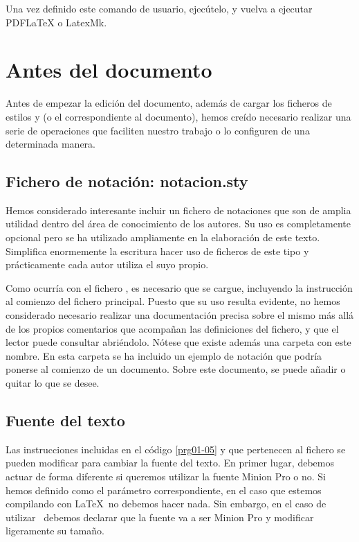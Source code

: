 Una vez definido este comando de usuario, ejecútelo, y vuelva a ejecutar PDFLaTeX o LatexMk.

\section{Antes del documento}
Antes de empezar la edición del documento, además de cargar los ficheros de estilos  y  (o el correspondiente al documento),  hemos creído necesario realizar una serie de operaciones que faciliten nuestro trabajo o lo configuren de una determinada manera. %

\subsection{Fichero de notación: notacion.sty}
Hemos considerado interesante incluir un fichero de notaciones que son de amplia utilidad dentro del área de conocimiento de los autores. Su uso es completamente opcional pero se ha utilizado ampliamente en la elaboración de este texto. Simplifica enormemente la escritura hacer uso de ficheros de este tipo y prácticamente cada autor utiliza el suyo propio.

Como ocurría con el fichero , es necesario que se cargue, incluyendo la instrucción  al comienzo del fichero principal. Puesto que su uso resulta evidente, no hemos considerado necesario realizar una documentación precisa sobre el mismo más allá de los propios comentarios que acompañan las definiciones del fichero, y que el lector puede consultar abriéndolo. Nótese que existe además una carpeta con este nombre. En esta carpeta se ha incluido un ejemplo de notación que podría ponerse al comienzo de un documento. Sobre este documento, se puede añadir o quitar lo que se desee.

\subsection{Fuente del texto}
Las instrucciones incluidas en el código \ref{prg01-05} y que pertenecen al fichero  
 se pueden modificar para cambiar la fuente del texto.  En primer lugar, debemos actuar de forma diferente si queremos utilizar la fuente Minion Pro o no.  Si hemos definido como  el parámetro correspondiente, en el caso que estemos compilando con \LaTeX\ no debemos hacer nada. Sin embargo, en el caso de utilizar \LuaLaTeX\ debemos declarar que la fuente va a ser Minion Pro y modificar ligeramente su tamaño.
 
